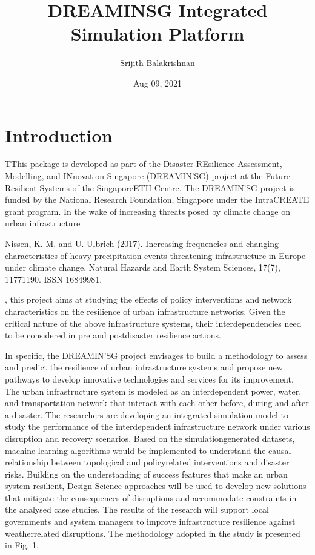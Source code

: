 \documentclass[letterpaper,10pt,english]{sphinxmanual}
\title{DREAMIN\textquotesingle{}SG Integrated Simulation Platform}
\date{Aug 09, 2021}
\author{Srijith Balakrishnan}
\begin{document}
\pagestyle{empty}
\sphinxmaketitle
\pagestyle{plain}
\sphinxtableofcontents
\pagestyle{normal}
\label{\detokenize{index::doc}}



\chapter{Introduction}
\label{\detokenize{intro:introduction}}\label{\detokenize{intro::doc}}
\sphinxAtStartPar
TThis package is developed as part of the Disaster REsilience Assessment,
Modelling, and INno\sphinxhyphen{}vation Singapore (DREAMIN’SG) project at the Future
Resilient Systems of the Singapore\sphinxhyphen{}ETH Centre. The DREAMIN’SG project is
funded by the National Research Foundation, Singapore under the Intra\sphinxhyphen{}CREATE
grant program. In the wake of increasing threats posed by climate change
on urban infrastructure %
\begin{footnote}[1]\sphinxAtStartFootnote
Nissen, K. M. and U. Ulbrich (2017). Increasing frequencies and changing characteristics of heavy precipitation events threatening infrastructure in Europe under climate change. Natural Hazards and Earth System Sciences, 17(7), 1177\textendash{}1190. ISSN 16849981.
%
\end{footnote}, this project aims at
studying the effects of policy interventions and network characteristics on
the resilience of urban infrastructure networks. Given the critical nature of
the above infrastructure systems, their interdependencies need to be
considered in pre\sphinxhyphen{} and post\sphinxhyphen{}disaster resilience actions.

\sphinxAtStartPar
In specific, the DREAMIN’SG project envisages to build a methodology to assess and predict
the resilience of urban infrastructure systems and propose new pathways to
develop innovative technologies and services for its improvement. The urban
infrastructure system is modeled as an interdependent power\sphinxhyphen{}, water\sphinxhyphen{}, and
transportation network that interact with each other before, during and
after a disaster. The researchers are developing an integrated simulation
model to study the performance of the interdependent infrastructure network
under various disruption and recov\sphinxhyphen{}ery scenarios. Based on the
simulation\sphinxhyphen{}generated datasets, machine learning algorithms would be implemented
to understand the causal relationship between topological and policy\sphinxhyphen{}related
interventions and disaster risks. Building on the understanding of success
features that make an urban system resilient, Design Science approaches will
be used to develop new solutions that mitigate the consequences of
disruptions and accommodate constraints in the analysed case studies.
The results of the research will support local governments and system managers
to improve infrastructure resilience against weather\sphinxhyphen{}related disruptions.
The methodology adopted in the study is presented in Fig. 1.
\end{document}
